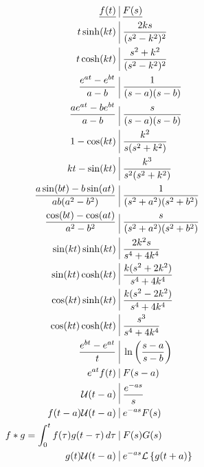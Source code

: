 \documentclass[12pt]{article}
\begin{document}
\begin{multicols}{2}
\begin{equation*}
  \begin{split}
    \underline{f(t)}\,\,&\vline\,\,\underline{F(s)}\\
    t\sinh(kt)\,\,&\vline\,\,\frac{2ks}{(s^2-k^2)^2}\\
    t\cosh(kt)\,\,&\vline\,\,\frac{s^2+k^2}{(s^2-k^2)^2}\\
    \frac{e^{at}-e^{bt}}{a-b}\,\,&\vline\,\,\frac{1}{(s-a)(s-b)}\\
    \frac{ae^{at}-be^{bt}}{a-b}\,\,&\vline\,\,\frac{s}{(s-a)(s-b)}\\
    1-\cos(kt)\,\,&\vline\,\,\frac{k^2}{s(s^2+k^2)}\\
    kt-\sin(kt)\,\,&\vline\,\,\frac{k^3}{s^2(s^2+k^2)}\\
    \frac{a\sin(bt)-b\sin(at)}{ab(a^2-b^2)}\,\,&\vline\,\,\frac{1}{(s^2+a^2)(s^2+b^2)}\\
    \frac{\cos(bt)-\cos(at)}{a^2-b^2}\,\,&\vline\,\,\frac{s}{(s^2+a^2)(s^2+b^2)}\\
    \sin(kt)\sinh(kt)\,\,&\vline\,\,\frac{2k^2s}{s^4+4k^4}\\
    \sin(kt)\cosh(kt)\,\,&\vline\,\,\frac{k(s^2+2k^2)}{s^4+4k^4}\\
    \cos(kt)\sinh(kt)\,\,&\vline\,\,\frac{k(s^2-2k^2)}{s^4+4k^4}\\
    \cos(kt)\cosh(kt)\,\,&\vline\,\,\frac{s^3}{s^4+4k^4}\\
    \frac{e^{bt}-e^{at}}{t}\,\,&\vline\,\,\ln\left(\frac{s-a}{s-b}\right)\\
    e^{at}f(t)\,\,&\vline\,\,F(s-a)\\
    \mathcal{U}(t-a)\,\,&\vline\,\,\frac{e^{-as}}{s}\\
    f(t-a)\mathcal{U}(t-a)\,\,&\vline\,\,e^{-as}F(s)\\
    f\ast g=\int_0^t f(\tau)g(t-\tau)\,d\tau\,\,&\vline\,\,F(s)G(s)\\
    g(t)\mathcal{U}(t-a)\,\,&\vline\,\,e^{-as}\mathcal{L}\left\{ g(t+a) \right\}\\
  \end{split}
  \label{4}
  \end{equation*}

\end{multicols}
\end{document}
